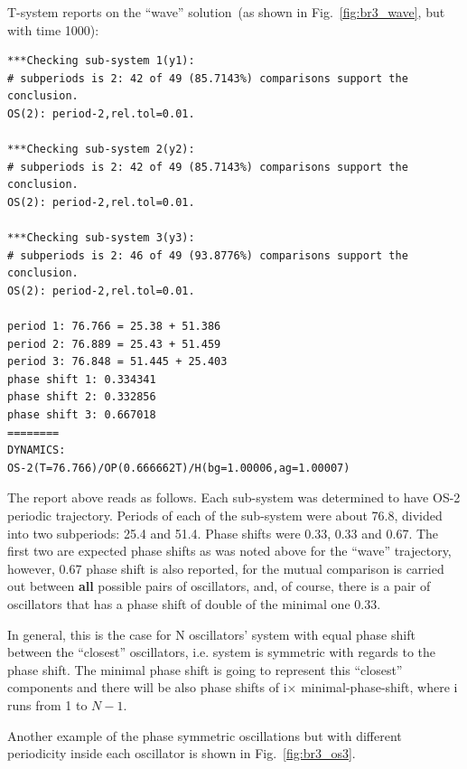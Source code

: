 \documentclass[11pt,a4paper]{article}
\begin{document}
T-system reports on the ``wave'' solution~(as shown in Fig.~\ref{fig:br3_wave}, but
with time 1000):
\begin{verbatim}
***Checking sub-system 1(y1):
# subperiods is 2: 42 of 49 (85.7143%) comparisons support the conclusion.
OS(2): period-2,rel.tol=0.01.

***Checking sub-system 2(y2):
# subperiods is 2: 42 of 49 (85.7143%) comparisons support the conclusion.
OS(2): period-2,rel.tol=0.01.

***Checking sub-system 3(y3):
# subperiods is 2: 46 of 49 (93.8776%) comparisons support the conclusion.
OS(2): period-2,rel.tol=0.01.

period 1: 76.766 = 25.38 + 51.386
period 2: 76.889 = 25.43 + 51.459
period 3: 76.848 = 51.445 + 25.403
phase shift 1: 0.334341
phase shift 2: 0.332856
phase shift 3: 0.667018
========
DYNAMICS:
OS-2(T=76.766)/OP(0.666662T)/H(bg=1.00006,ag=1.00007)
\end{verbatim}

The report above reads as follows. Each sub-system was determined to have OS-2
periodic trajectory. Periods of each of the sub-system were about 76.8, divided into
two subperiods: 25.4 and 51.4. Phase shifts  were 0.33, 0.33 and 0.67. The first two
are expected phase shifts as was noted above for the ``wave'' trajectory, however,
0.67 phase shift is also reported, for the mutual comparison is carried out between
\textbf{all} possible pairs of oscillators, and, of course, there is a pair of
oscillators that has a phase shift of double of the minimal one 0.33.

In general, this is the case for N oscillators' system with equal phase shift between
the ``closest'' oscillators, i.e. system is symmetric with regards to the phase
shift. The minimal phase shift is going to represent this ``closest'' components and
there will be also phase shifts of i$\times$ minimal-phase-shift, where i runs from 1
to $N-1$.

Another example of the phase symmetric oscillations but with different periodicity
inside each oscillator is shown in Fig.~\ref{fig:br3_os3}.
\end{document}
